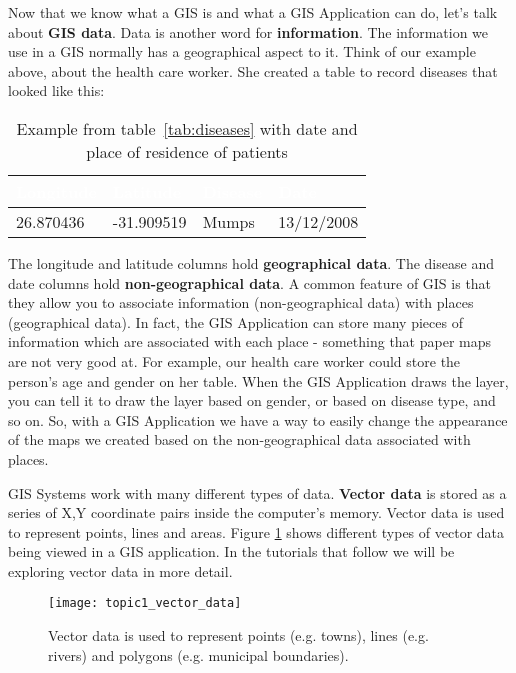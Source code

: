 Now that we know what a GIS is and what a GIS Application can do, let's talk
about \textbf{GIS data}. Data is another word for \textbf{information}. The
information we use in a GIS normally has a geographical aspect to it. Think
of our example above, about the health care worker. She created a table to
record diseases that looked like this:

\begin{table}[ht]
\centering
\caption{Example from table~\ref{tab:diseases} with date and place of
residence of patients}\medskip
 \begin{tabular}{|p{3cm}|p{3cm}|p{3cm}|p{3cm}|}
 \hline
 \rowcolor{black}
 \textcolor{white}{\textbf{Longitude}} &
 \textcolor{white}{\textbf{Latitude}} &
 \textcolor{white}{\textbf{Disease}} &
 \textcolor{white}{\textbf{Date}} \\
 \hline 26.870436 & -31.909519 & Mumps & 13/12/2008 \\
\hline
\end{tabular}
\end{table}

The longitude and latitude columns hold \textbf{geographical data}. The disease and
date columns hold \textbf{non-geographical data}. A common feature of GIS is that they
allow you to associate information (non-geographical data) with places
(geographical data). In fact, the GIS Application can store many pieces of
information which are associated with each place - something that paper maps
are not very good at. For example, our health care worker could store the
person's age and gender on her table. When the GIS Application draws the
layer, you can tell it to draw the layer based on gender, or based on disease
type, and so on. So, with a GIS Application we have a way to easily change
the appearance of the maps we created based on the non-geographical data
associated with places.

GIS Systems work with many different types of data. \textbf{Vector data} is stored as
a series of X,Y coordinate pairs inside the computer's memory. Vector data is
used to represent points, lines and areas. Figure \ref{fig:vectordata} shows
different types of vector data being viewed in a GIS application. In the
tutorials that follow we will be exploring vector data in more detail. 

\begin{figure}[ht]
   \begin{center}
   \caption{Vector data is used to represent points (e.g. towns), lines (e.g.
   rivers) and polygons (e.g. municipal boundaries).}
   \label{fig:vectordata}\smallskip
   \texttt{[image: topic1\_vector\_data]}
\end{center}
\end{figure}

